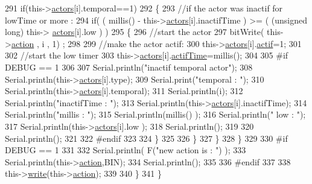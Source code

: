 \begin{DoxyCode}
291                 \textcolor{keywordflow}{if}(this->\hyperlink{class_jetpack_a7e16d2f97837f9712a2e6de1c50d99db}{actors}[i].temporal==1)
292                 \{
293                     \textcolor{comment}{//if the actor was inactif for lowTime or more :}
294                     \textcolor{keywordflow}{if}( ( millis() - this->\hyperlink{class_jetpack_a7e16d2f97837f9712a2e6de1c50d99db}{actors}[i].inactifTime ) >= ( (\textcolor{keywordtype}{unsigned} \textcolor{keywordtype}{long}) this->
      \hyperlink{class_jetpack_a7e16d2f97837f9712a2e6de1c50d99db}{actors}[i].low  ) )
295                     \{
296                         \textcolor{comment}{//start the actor}
297                         bitWrite( this->\hyperlink{class_jetpack_aca3142925a7b0834b34ae91d26af7765}{action} , i , 1) ;
298 
299                         \textcolor{comment}{//make the actor actif:}
300                         this->\hyperlink{class_jetpack_a7e16d2f97837f9712a2e6de1c50d99db}{actors}[i].\hyperlink{struct_jetpack_1_1state_aa177541689bbaea21a4650a083b0df77}{actif}=1;
301 
302                         \textcolor{comment}{//start the low timer}
303                         this->\hyperlink{class_jetpack_a7e16d2f97837f9712a2e6de1c50d99db}{actors}[i].\hyperlink{struct_jetpack_1_1state_af2e1cc323ef9ffcc3cf4d203f85d726b}{actifTime}=millis();
304 
305 \textcolor{preprocessor}{                    #if DEBUG == 1 }
306                         
307                         Serial.println(\textcolor{stringliteral}{"inactif temporal actor"});
308                         Serial.println(this->\hyperlink{class_jetpack_a7e16d2f97837f9712a2e6de1c50d99db}{actors}[i].type);
309                         Serial.print(\textcolor{stringliteral}{"temporal : "});
310                         Serial.println(this->\hyperlink{class_jetpack_a7e16d2f97837f9712a2e6de1c50d99db}{actors}[i].temporal);
311                         Serial.println(i);
312                         Serial.println(\textcolor{stringliteral}{"inactifTime : "});
313                         Serial.println(this->\hyperlink{class_jetpack_a7e16d2f97837f9712a2e6de1c50d99db}{actors}[i].inactifTime);
314                         Serial.println(\textcolor{stringliteral}{"millis : "});
315                         Serial.println(millis() );
316                         Serial.println(\textcolor{stringliteral}{" low : "});
317                         Serial.println(this->\hyperlink{class_jetpack_a7e16d2f97837f9712a2e6de1c50d99db}{actors}[i].low );
318                         Serial.println();
319 
320                         Serial.println();
321                     
322 \textcolor{preprocessor}{                    #endif}
323                 
324                     \}           
325             
326                 \}
327             \}
328         \}
329     
330 \textcolor{preprocessor}{    #if DEBUG == 1 }
331 
332         Serial.println( F(\textcolor{stringliteral}{"new action is : "}) );
333         Serial.println(this->\hyperlink{class_jetpack_aca3142925a7b0834b34ae91d26af7765}{action},BIN);
334         Serial.println();
335     
336 \textcolor{preprocessor}{    #endif }
337 
338         this->\hyperlink{class_jetpack_a338f1af8cbc6504ac69b47c7328569b5}{write}(this->\hyperlink{class_jetpack_aca3142925a7b0834b34ae91d26af7765}{action});
339 
340     \} 
341 \}
\end{DoxyCode}
